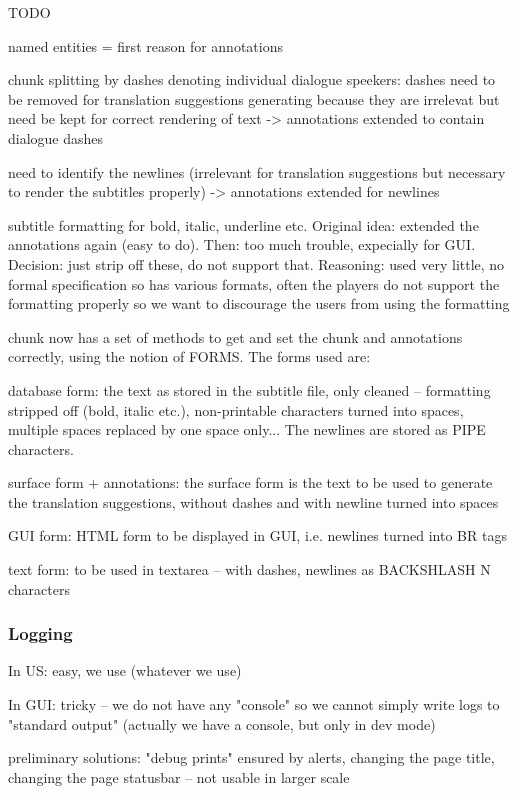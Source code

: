 TODO

named entities = first reason for annotations

chunk splitting by dashes denoting individual dialogue speekers: dashes need to be removed for translation suggestions generating because they are irrelevat but need be kept for correct rendering of text -> annotations extended to contain dialogue dashes

need to identify the newlines (irrelevant for translation suggestions but necessary to render the subtitles properly) -> annotations extended for newlines

subtitle formatting for bold, italic, underline etc. Original idea: extended the annotations again (easy to do). Then: too much trouble, expecially for GUI. Decision: just strip off these, do not support that. Reasoning: used very little, no formal specification so has various formats, often the players do not support the formatting properly so we want to discourage the users from using the formatting

chunk now has a set of methods to get and set the chunk and annotations correctly, using the notion of FORMS. The forms used are:

database form: the text as stored in the subtitle file, only cleaned -- formatting stripped off (bold, italic etc.), non-printable characters turned into spaces, multiple spaces replaced by one space only... The newlines are stored as PIPE characters.

surface form + annotations: the surface form is the text to be used to generate the translation suggestions, without dashes and with newline turned into spaces

GUI form: HTML form to be displayed in GUI, i.e. newlines turned into BR tags

text form: to be used in textarea -- with dashes, newlines as BACKSHLASH N characters

\subsubsection{Logging}

In US: easy, we use (whatever we use)


In GUI: tricky -- we do not have any "console" so we cannot simply write logs to "standard output"
(actually we have a console, but only in dev mode)

preliminary solutions: "debug prints" ensured by alerts, changing the page title, changing the page statusbar -- not usable in larger scale

